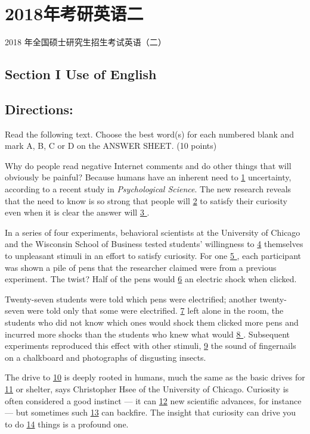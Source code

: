 \documentclass[UTF8,11pt]{ctexart}
\begin{document}
\section*{2018年考研英语二}
2018 年全国硕士研究生招生考试英语（二）


\subsection*{\textbf{Section I Use of English}}


\subsection*{\textbf{Directions:}}


Read the following text. Choose the best word(s) for each numbered blank and mark A, B, C or D on the ANSWER SHEET. (10 points)


Why do people read negative Internet comments and do other things that will obviously be painful? Because humans have an inherent need to \uline{1} uncertainty, according to a recent study in \textit{Psychological Science}. The new research reveals that the need to know is so strong that people will \uline{2} to satisfy their curiosity even when it is clear the answer will \uline{3 }.


In a series of four experiments, behavioral scientists at the University of Chicago and the Wisconsin School of Business tested students’ willingness to \uline{4} themselves to unpleasant stimuli in an effort to satisfy curiosity. For one \uline{5 }, each participant was shown a pile of pens that the researcher claimed were from a previous experiment. The twist? Half of the pens would \uline{6} an electric shock when clicked.


Twenty-seven students were told which pens were electrified; another twenty-seven were told only that some were electrified. \uline{7} left alone in the room, the students who did not know which ones would shock them clicked more pens and incurred more shocks than the students who knew what would \uline{8 }. Subsequent experiments reproduced this effect with other stimuli, \uline{9} the sound of fingernails on a chalkboard and photographs of disgusting insects.


The drive to \uline{10} is deeply rooted in humans, much the same as the basic drives for \uline{11} or shelter, says Christopher Hsee of the University of Chicago. Curiosity is often considered a good instinct — it can \uline{12} new scientific advances, for instance — but sometimes such \uline{13} can backfire. The insight that curiosity can drive you to do \uline{14} things is a profound one.
\end{document}
